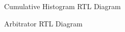 \documentclass[12pt]{article}
\begin{document}
  
    \begin{figure}[H]
    \caption{Cumulative Histogram RTL Diagram}
    \label{fig:nomr_modhistrtlc}
  \end{figure}
  
  
    \begin{figure}[H]
    \caption{Arbitrator RTL Diagram}
    \label{fig:narobmr_modhist}
  \end{figure}
  
\end{document}
